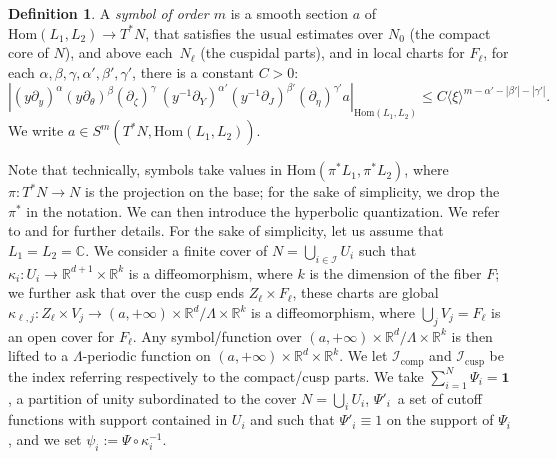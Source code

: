 \documentclass[10pt]{amsart}
\newcommand{\C}{\mathbb{C}}
\newcommand{\R}{\mathbb{R}}
\newcommand{\mc}{\mathcal}
\theoremstyle{plain}
\theoremstyle{definition}
\newtheorem{definition}{Definition}[section]
\begin{document}
\begin{definition}
A \emph{symbol of order $m$} is a smooth section $a$ of $\mathrm{Hom}(L_1,L_2)\to T^\ast N$, that satisfies the usual estimates over $N_0$ (the compact core of $N$), and above each~$N_\ell$ (the cuspidal parts), and in local charts for $F_\ell$, for each $\alpha,\beta,\gamma,\alpha',\beta',\gamma'$, there is a constant $C>0$:
\[
\left|(y\partial_y)^\alpha (y\partial_\theta)^\beta (\partial_\zeta)^\gamma \ (y^{-1}\partial_Y)^{\alpha'}(y^{-1}\partial_J)^{\beta'} (\partial_\eta)^{\gamma'} a \right|_{\mathrm{Hom}(L_1,L_2)} \leq C \langle \xi \rangle^{m - \alpha' - |\beta'| - |\gamma'|}.
\]
We write $a\in S^m(T^\ast N, \mathrm{Hom}(L_1,L_2))$.
\end{definition}

Note that technically, symbols take values in $\mathrm{Hom}(\pi^*L_1,\pi^*L_2)$, where \hbox{$\pi : T^*N \!\to\! N$} is the projection on the base; for the sake of simplicity, we drop the $\pi^*$ in the notation. We can then introduce the hyperbolic quantization. We refer to \cite{Bonthonneau-16} and \cite[App.]{Bonthonneau-Weich-17} for further details. For the sake of simplicity, let us assume that $L_1 = L_2 = \C$. We consider a finite cover of $N = \bigcup_{i \in \mc{I}} U_i$ such that $\kappa_i : U_i \to \R^{d+1} \times \R^k$ is a diffeomorphism, where $k$ is the dimension of the fiber $F$; we further ask that over the cusp ends $Z_\ell \times F_\ell$, these charts are global \ie $\kappa_{\ell,j} : Z_\ell \times V_j \to (a,+\infty) \times \R^d/\Lambda \times \R^k$ is a diffeomorphism, where $\bigcup_j V_j = F_{\ell}$ is an open cover for $F_\ell$. Any symbol/function over $(a,+\infty) \times \R^d/\Lambda \times \R^k$ is then lifted to a $\Lambda$-periodic function on $(a,+\infty) \times \R^d \times \R^k$. We let $\mc{I}_{\mathrm{comp}}$ and $\mc{I}_{\mathrm{cusp}}$ be the index referring respectively to the compact/cusp parts. We take $\sum_{i=1}^N \Psi_i = \mathbf{1}$, a partition of unity subordinated to the cover $N=\bigcup_i U_i$, $\Psi'_i$~a set of cutoff functions with support contained in $U_i$ and such that $\Psi'_i \equiv 1$ on the support of $\Psi_i$, and we set $\psi_i := \Psi \circ \kappa_i^{-1}$.
\end{document}
